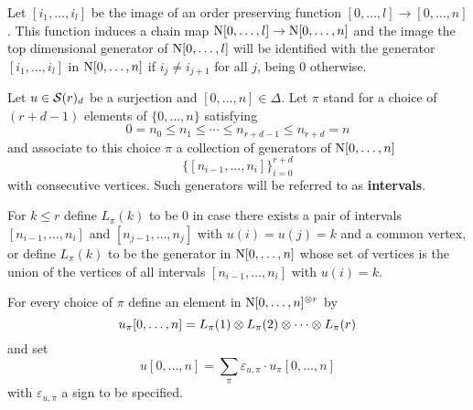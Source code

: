 \documentclass[main.tex]{subfiles}
\begin{document}
Let $[i_1,\dotsc,i_l]$ be the image of an order preserving function $[0,\dotsc,l]\to[0,\dotsc,n]$. This function induces a chain map $\chains [0,\dotsc,l]\to\chains [0,\dotsc,n]$ and the image the top dimensional generator of $\chains [0,\dotsc,l]$ will be identified with the generator $[i_1,\dotsc,i_l]$ in $\chains [0,\dotsc,n]$ if $i_j\neq i_{j+1}$ for all $j$, being $0$ otherwise.

Let $u\in\S(r)_d$ be a surjection and $[0,\dotsc,n]\in\Delta$. Let $\pi$ stand for a choice of $(r+d-1)$ elements of $\{0,\dotsc,n\}$ satisfying $$0=n_0\leq n_1\leq\dotsb\leq n_{r+d-1}\leq n_{r+d}=n$$
and associate to this choice $\pi$ a collection of generators of $\chains [0,\dotsc,n]$
$$\big\{[n_{i-1},\dotsc,n_i]\big\}_{i=0}^{r+d}$$
with consecutive vertices. Such generators will be referred to as \textbf{intervals}.

For $k\leq r$ define $L_{\pi}(k)$ to be $0$ in case there exists a pair of intervals $[n_{i-1},\dotsc,n_i]$ and $[n_{j-1},\dotsc,n_j]$ with $u(i)=u(j)=k$ and a common vertex, or define $L_{\pi}(k)$ to be the generator in $\chains[0,\dotsc,n]$ whose set of vertices is the union of the vertices of all intervals $[n_{i-1},\dotsc,n_i]$ with $u(i)=k$.

For every choice of $\pi$ define an element in $\chains[0,\dotsc,n]^{\tensor r}$ by $$u_\pi[0,\dotsc,n]=L_{\pi}(1)\tensor L_{\pi}(2)\tensor\dotsb\tensor L_{\pi}(r)$$
and set
$$u[0,\dotsc,n]=\sum_\pi\varepsilon_{u,\pi}\cdot u_\pi[0,\dotsc,n]$$ with $\varepsilon_{u,\pi}$ a sign to be specified.
\end{document}
